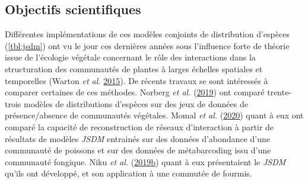 \documentclass[12pt,]{article}
\begin{document}
\hypertarget{objectifs-scientifiques}{%
\subsection{Objectifs scientifiques}\label{objectifs-scientifiques}}

Différentes implémentations de ces modèles conjoints de distribution
d'espèces (\cref{tbl:jsdm}) ont vu le jour ces dernières années sous
l'influence forte de théorie issue de l'écologie végétale concernant le
rôle des interactions dans la structuration des communautés de plantes à
larges échelles spatiales et temporelles (Warton \emph{et al.}
\protect\hyperlink{ref-warton2015}{2015}). De récents travaux se sont
intéressés à comparer certaines de ces méthodes. Norberg \emph{et al.}
(\protect\hyperlink{ref-Norberg_2020}{2019}) ont comparé trente-trois
modèles de distributions d'espèces sur des jeux de données de
présence/absence de communautés végétales. Momal \emph{et al.}
(\protect\hyperlink{ref-Momal_2020}{2020}) quant à eux ont comparé la
capacité de reconstruction de réseaux d'interaction à partir de
résultats de modèles \emph{JSDM} entrainés sur des données d'abondance
d'une communauté de poissons et sur des données de métabarcoding issu
d'une communauté fongique. Niku \emph{et al.}
(\protect\hyperlink{ref-Niku_2019}{2019}\protect\hyperlink{ref-Niku_2019}{b})
quant à eux présentaient le \emph{JSDM} qu'ils ont développé, et son
application à une commutée de fourmis.
\end{document}
